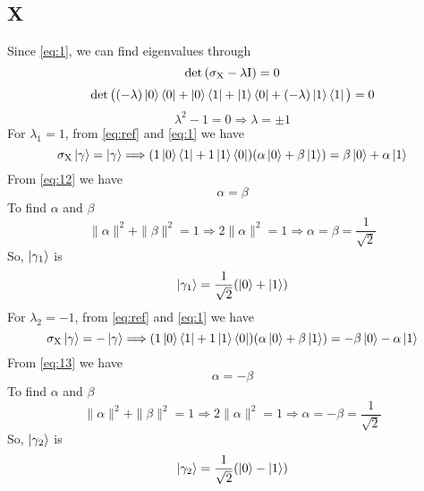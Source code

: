 \documentclass[12pt]{article}
\begin{document}
\subsection{X}
Since \ref{eq:1}, we can find eigenvalues through
\begin{equation}
\det{(\sigma_{\textnormal{X}} - \lambda\textnormal{I})} = 0
\end{equation}
\begin{equation*}
\det{\big((-\lambda)\ket{0}\bra{0} + \ket{0}\bra{1} + \ket{1}\bra{0} + (-\lambda)\ket{1}\bra{1}\big)} = 0
\end{equation*}
\begin{equation*}
    \lambda^2 - 1 = 0 \Longrightarrow \lambda = \pm 1
\end{equation*}
For $\lambda_1 = 1$, from \ref{eq:ref} and \ref{eq:1} we have
\begin{equation}
    \label{eq:12}
    \sigma_{\textnormal{X}}\ket{\gamma} = \ket{\gamma} \Longrightarrow (1\ket{0}\bra{1} + 1\ket{1}\bra{0})(\alpha\ket{0}+\beta\ket{1}) = \beta\ket{0}+\alpha\ket{1} 
\end{equation}
From \ref{eq:12} we have
\begin{equation}
    \alpha = \beta
\end{equation}
To find $\alpha$ and $\beta$
\begin{equation}
    \|\alpha\|^2 + \|\beta\|^2 = 1 \Longrightarrow 2\|\alpha\|^2 = 1 \Longrightarrow \alpha = \beta = \frac{1}{\sqrt{2}}
\end{equation}
So, $\ket{\gamma_{1}}$ is
\begin{equation}
    \ket{\gamma_{1}} = \frac{1}{\sqrt{2}}(\ket{0} + \ket{1})
\end{equation}
For $\lambda_2 = -1$, from \ref{eq:ref} and \ref{eq:1} we have
\begin{equation}
    \label{eq:13}
    \sigma_{\textnormal{X}}\ket{\gamma} = -\ket{\gamma} \Longrightarrow (1\ket{0}\bra{1} + 1\ket{1}\bra{0})(\alpha\ket{0}+\beta\ket{1}) = -\beta\ket{0}-\alpha\ket{1} 
\end{equation}
From \ref{eq:13} we have
\begin{equation}
    \alpha = -\beta
\end{equation}
To find $\alpha$ and $\beta$
\begin{equation}
    \|\alpha\|^2 + \|\beta\|^2 = 1 \Longrightarrow 2\|\alpha\|^2 = 1 \Longrightarrow \alpha = - \beta = \frac{1}{\sqrt{2}}
\end{equation}
So, $\ket{\gamma_{2}}$ is
\begin{equation}
    \ket{\gamma_{2}} = \frac{1}{\sqrt{2}}(\ket{0} - \ket{1})
\end{equation}
\end{document}
